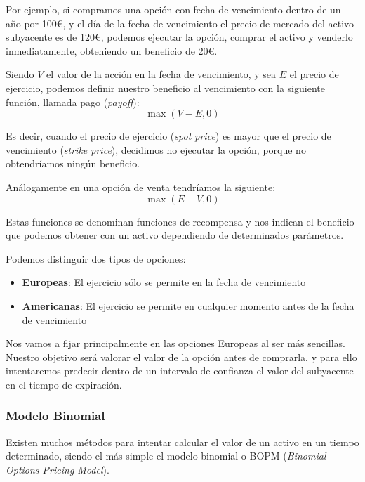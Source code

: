 Por ejemplo, si compramos una opción con fecha de vencimiento dentro de un año por 100€, y el día de la fecha de vencimiento el precio de mercado del activo subyacente es de 120€, podemos ejecutar la opción, comprar el activo y venderlo inmediatamente, obteniendo un beneficio de 20€.

Siendo $V$ el valor de la acción en la fecha de vencimiento, y sea $E$ el precio de ejercicio, podemos definir nuestro beneficio al vencimiento con la siguiente función, llamada pago (\textit{payoff}):
\begin{equation}
    \label{eq:optionput}  
    \max\left(V-E, 0\right)
\end{equation}

Es decir, cuando el precio de ejercicio (\textit{spot price}) es mayor que el precio de vencimiento (\textit{strike price}), decidimos no ejecutar la opción, porque no obtendríamos ningún beneficio.

Análogamente en una opción de venta tendríamos la siguiente:
\begin{equation}
    \label{eq:optioncall}
    \max\left(E-V, 0\right)
\end{equation}

Estas funciones se denominan funciones de recompensa y nos indican el beneficio que podemos obtener con un activo dependiendo de determinados parámetros.

Podemos distinguir dos tipos de opciones:
\begin{itemize}
    \item \textbf{Europeas}: El ejercicio sólo se permite en la fecha de vencimiento
    \item \textbf{Americanas}: El ejercicio se permite en cualquier momento antes de la fecha de vencimiento
\end{itemize}

Nos vamos a fijar principalmente en las opciones Europeas al ser más sencillas. Nuestro objetivo será valorar el valor de la opción antes de comprarla, y para ello intentaremos predecir dentro de un intervalo de confianza el valor del subyacente en el tiempo de expiración.

\subsubsection{Modelo Binomial}
Existen muchos métodos para intentar calcular el valor de un activo en un tiempo determinado, siendo el más simple el modelo binomial o BOPM (\textit{Binomial Options Pricing Model}).

